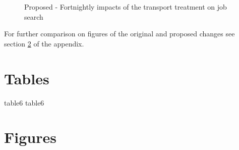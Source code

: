 \documentclass{article}
\begin{document}
\begin{figure}[h!]
\censubtering
\caption{Proposed - Fortnightly impacts of the transport treatment on job search}
  \qquad
  \label{fig: 1 proposed}
\end{figure}

\medskip

\noindent For further comparison on figures  of the original and proposed changes see section \ref{apendix figures} of the appendix.
\newpage


\newpage
\appendix
\section{Tables} \label{apendix tables}

{table6}\label{tab:FD table 6 o}
{table6}\label{tab:FD table 6 p}

\section{Figures} \label{apendix figures}
\end{document}
